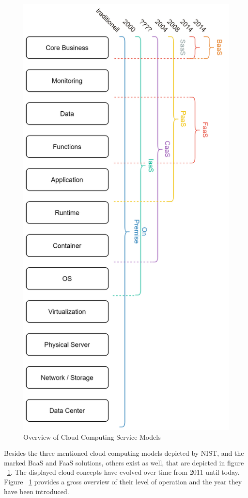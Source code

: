 \documentclass[a4paper,twoside,11pt, pagesize]{scrartcl}
\begin{document}
\begin{figure}[H]
\caption{Overview of Cloud Computing Service-Models}
\label{fig:cloudComputingConcepts}
\centering
\includegraphics[angle=90,width=1\textwidth]{serviceModels}
\end{figure}
Besides the three mentioned cloud computing models depicted by NIST, and the marked BaaS and FaaS solutions, others exist as well, that are depicted in figure ~\ref{fig:cloudComputingConcepts}. The displayed cloud concepts have evolved over time from 2011 until today. Figure ~\ref{fig:cloudComputingConcepts} provides a gross overview of their level of operation and the year they have been introduced. 
\end{document}
